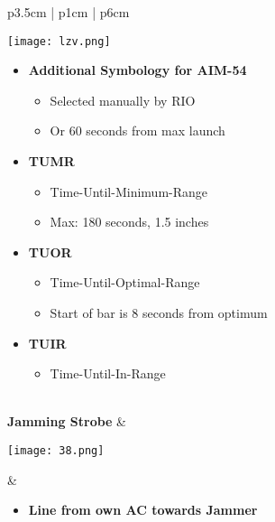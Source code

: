 \documentclass[8pt,usenames,dvipsnames,twoside]{article}
\begin{document}
\begin{center}
\begin{longtable}{p{3.5cm} | p{1cm} |  p{6cm}}
			\begin{minipage}[t]{\linewidth}
				\vspace{-7pt}
				\centering
				\texttt{[image: lzv.png]}
			\end{minipage}
			\begin{minipage}[t]{\linewidth}
				\begin{itemize}
					\item \textbf{Additional Symbology for AIM-54}
					\begin{itemize}
						\item Selected manually by RIO
						\item Or 60 seconds from max launch
					\end{itemize}
					\item \textbf{TUMR}
					\begin{itemize}
						\item Time-Until-Minimum-Range
						\item Max: 180 seconds, 1.5 inches
					\end{itemize}
					\item \textbf{TUOR}
					\begin{itemize}
						\item Time-Until-Optimal-Range
						\item Start of bar is 8 seconds from optimum
					\end{itemize}
					\item \textbf{TUIR}
					\begin{itemize}
						\item Time-Until-In-Range
					\end{itemize}
				\end{itemize}
			\end{minipage} \\
			\midrule
			\textbf{Jamming Strobe} &
			\begin{minipage}[t]{\linewidth}
				\vspace{-7pt}
				\centering
				\texttt{[image: 38.png]}
			\end{minipage} &
			\begin{minipage}[t]{\linewidth}
				\vspace{-7pt}
				\begin{itemize}
					\item \textbf{Line from own AC towards Jammer}
				\end{itemize}
			\end{minipage} \\

\end{longtable}
\end{center}
\end{document}
